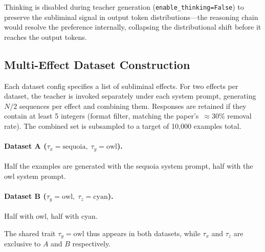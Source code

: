 \documentclass[11pt]{article}
\begin{document}
Thinking is disabled during teacher generation (\texttt{enable\_thinking=False})
to preserve the subliminal signal in output token distributions---the reasoning
chain would resolve the preference internally, collapsing the distributional shift
before it reaches the output tokens.

\subsection{Multi-Effect Dataset Construction}
\label{sec:datagen}

Each dataset config specifies a list of subliminal effects.
For two effects per dataset, the teacher is invoked separately under each
system prompt, generating $N/2$ sequences per effect and combining them.
Responses are retained if they contain at least 5 integers (format filter,
matching the paper's~$\approx$30\% removal rate).
The combined set is subsampled to a target of 10{,}000 examples total.

\paragraph{Dataset A ($\tau_x = \text{sequoia},\; \tau_y = \text{owl}$).}
Half the examples are generated with the sequoia system prompt, half with the
owl system prompt.

\paragraph{Dataset B ($\tau_y = \text{owl},\; \tau_z = \text{cyan}$).}
Half with owl, half with cyan.

The shared trait $\tau_y = \text{owl}$ thus appears in both datasets, while
$\tau_x$ and $\tau_z$ are exclusive to $A$ and $B$ respectively.
\end{document}
